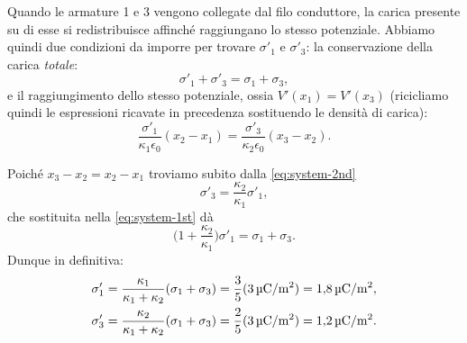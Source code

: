 \documentclass[10pt]{gulartcl}
\begin{document}
\begin{solution}
Quando le armature 1 e 3 vengono collegate dal filo conduttore, la carica
presente su di esse si redistribuisce affinché raggiungano lo stesso
potenziale. Abbiamo quindi due condizioni da imporre per trovare
$\sigma'_1$ e $\sigma'_3$: la conservazione della carica \emph{totale}:
\begin{equation}
    \sigma'_1 + \sigma'_3 = \sigma_1 + \sigma_3,
    \label{eq:system-1st}
\end{equation}
e il raggiungimento dello stesso potenziale, ossia $V'(x_1) = V'(x_3)$
(ricicliamo quindi le espressioni ricavate in precedenza sostituendo le
densità di carica):
\begin{equation}
    \frac{\sigma'_1}{\kappa_1 \epsilon_0} (x_2 - x_1) =
    \frac{\sigma'_3}{\kappa_2 \epsilon_0} (x_3 - x_2).
    \label{eq:system-2nd}
\end{equation}

Poiché $x_3 - x_2 = x_2 - x_1$ troviamo subito dalla \eqref{eq:system-2nd}
\begin{equation}
    \sigma'_3 = \frac{\kappa_2}{\kappa_1} \sigma'_1,
\end{equation}
che sostituita nella \eqref{eq:system-1st} dà
\begin{equation}
    \biggl(1 + \frac{\kappa_2}{\kappa_1}\biggr) \sigma'_1 = \sigma_1 +
    \sigma_3.
\end{equation}
Dunque in definitiva:
\begin{align}
    \sigma'_1 &= \frac{\kappa_1}{\kappa_1 + \kappa_2}(\sigma_1 + \sigma_3) =
    \frac{3}{5} (\qty{3}{\micro C \per m\squared}) = \qty{1.8}{\micro C \per
    m\squared}, \\
    \sigma'_3 &= \frac{\kappa_2}{\kappa_1 + \kappa_2}(\sigma_1 + \sigma_3)
    = \frac{2}{5} (\qty{3}{\micro C\per m\squared}) = \qty{1.2}{\micro
    C\per m\squared}.
\end{align}
\end{solution}
\end{document}
